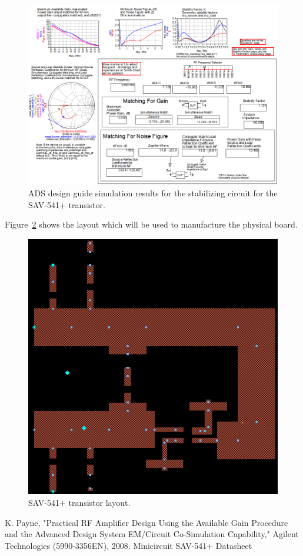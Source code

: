 \documentclass[conference]{IEEEtran}
\begin{document}
\begin{figure}[!h]
\centering
\includegraphics[scale=0.35]{pics/FinalStabilizingSimulation.png}
\caption{ADS design guide simulation results for the stabilizing circuit for the SAV-541+ transistor.}
\label{fig:finalstabsimulation}
\end{figure}

Figure~\ref{fig:lnaLayout} shows the layout which will be used to manufacture the physical board.
\begin{figure}[!h]
\centering
\includegraphics[scale=0.35]{LNApics/LNAlayout.png}
\caption{SAV-541+ transistor layout.}
\label{fig:lnaLayout}
\end{figure}

\begin{thebibliography}{1}
K. Payne, "Practical RF Amplifier Design Using the Available Gain Procedure and the Advanced Design System EM/Circuit Co-Simulation Capability," Agilent Technologies (5990-3356EN), 2008.
Minicircuit SAV-541+ Datasheet
\end{thebibliography}
\end{document}
